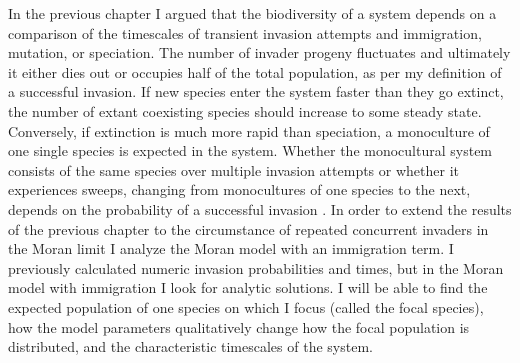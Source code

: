 In the previous chapter I argued that the biodiversity of a system depends on a comparison of the timescales of transient invasion attempts and immigration, mutation, or speciation. 
The number of invader progeny fluctuates and ultimately it either dies out or occupies half of the total population, as per my definition of a successful invasion. 
If new species enter the system faster than they go extinct, the number of extant coexisting species should increase to some steady state. %
Conversely, if extinction is much more rapid than speciation, a monoculture of one single species is expected in the system. 
Whether the monocultural system consists of the same species over multiple invasion attempts or whether it experiences sweeps, changing from monocultures of one species to the next, depends on the probability of a successful invasion \cite{Chesson1997,Chesson2000,Desai2007,Desai2007}. 
In order to extend the results of the previous chapter to the circumstance of repeated concurrent invaders in the Moran limit I analyze the Moran model with an immigration term. 
I previously calculated numeric invasion probabilities and times, but in the Moran model with immigration I look for analytic solutions. 
I will be able to find the expected population of one species on which I focus (called the focal species), how the model parameters qualitatively change how the focal population is distributed, and the characteristic timescales of the system. 


